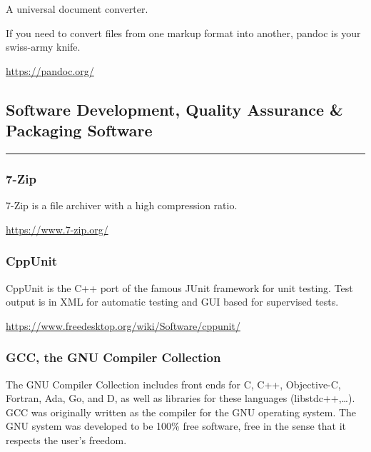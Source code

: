 \documentclass[
]{book}
\theoremstyle{definition}
\theoremstyle{definition}
\theoremstyle{definition}
\theoremstyle{definition}
\theoremstyle{remark}
\begin{document}
A universal document converter.

If you need to convert files from one markup format into another, pandoc is your swiss-army knife.

\url{https://pandoc.org/}

\hypertarget{software-development-quality-assurance-packaging-software}{%
\subsection*{Software Development, Quality Assurance \& Packaging Software}\label{software-development-quality-assurance-packaging-software}}

\begin{center}\rule{0.5\linewidth}{0.5pt}\end{center}

\hypertarget{zip}{%
\subsubsection*{7-Zip}\label{zip}}

7-Zip is a file archiver with a high compression ratio.

\url{https://www.7-zip.org/}

\hypertarget{cppunit}{%
\subsubsection*{CppUnit}\label{cppunit}}

CppUnit is the C++ port of the famous JUnit framework for unit testing. Test output is in XML for automatic testing and GUI based for supervised tests.

\url{https://www.freedesktop.org/wiki/Software/cppunit/}

\hypertarget{gcc-the-gnu-compiler-collection}{%
\subsubsection*{GCC, the GNU Compiler Collection}\label{gcc-the-gnu-compiler-collection}}

The GNU Compiler Collection includes front ends for C, C++, Objective-C, Fortran, Ada, Go, and D, as well as libraries for these languages (libstdc++,\ldots). GCC was originally written as the compiler for the GNU operating system. The GNU system was developed to be 100\% free software, free in the sense that it respects the user's freedom.
\end{document}
